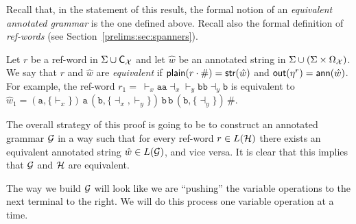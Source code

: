 Recall that, in the statement of this result, the formal notion of an
\emph{equivalent annotated grammar} is the one defined above.
Recall also the formal definition of
\emph{ref-words} (see Section~\ref{prelims:sec:spanners}).

%
%
%
%
%
%

Let $r$ be a ref-word in $\Sigma \cup \textsf{C}_{\mathcal{X}}$ and let $\hat{w}$ be an annotated string in $\Sigma \cup (\Sigma \times \Omega_{\mathcal{X}})$. We say that $r$ and $\hat{w}$ are \emph{equivalent} if $\textsf{plain}(r\cdot\#) = \mathsf{str}(\hat{w})$ and $\textsf{out}(\eta^{r}) = \textsf{ann}(\hat{w})$. 
For example, the ref-word $r_1 = \ \vdash_x\!\texttt{a}\texttt{a}\!\dashv_x\vdash_y\!\texttt{b}\texttt{b}\!\dashv_y\!\texttt{b}$ is equivalent to $\hat{w}_1 = (\texttt{a},\{\vdash_x\})\,\texttt{a}\,(\texttt{b},\{\dashv_x,\vdash_y\})\,\texttt{b}\,\texttt{b}\,(\texttt{b},\{\dashv_y\})\,\#$.

The overall strategy of this proof is going to be to construct an annotated grammar $\mathcal{G}$ in a way such that for every ref-word $r\in L(\mathcal{H})$ there exists an equivalent annotated string $\hat{w}\in L(\mathcal{G})$, and vice versa. It is clear that this implies that $\mathcal{G}$ and $\mathcal{H}$ are equivalent.

The way we build $\mathcal{G}$ will look like we are ``pushing'' the variable operations to the next terminal to the right. 
We will do this process one variable operation at a time.

